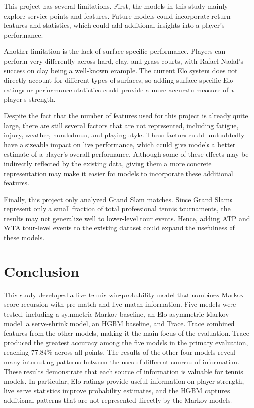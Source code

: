 \documentclass[10pt,twocolumn]{article}
\begin{document}
This project has several limitations. First, the models in this study mainly explore service points and features. Future models could incorporate return features and statistics, which could add additional insights into a player's performance.

Another limitation is the lack of surface-specific performance. Players can perform very differently across hard, clay, and grass courts, with Rafael Nadal's success on clay being a well-known example.\cite{bodo2010} The current Elo system does not directly account for different types of surfaces, so adding surface-specific Elo ratings or performance statistics could provide a more accurate measure of a player's strength.

Despite the fact that the number of features used for this project is already quite large, there are still several factors that are not represented, including fatigue, injury, weather, handedness, and playing style. These factors could undoubtedly have a sizeable impact on live performance, which could give models a better estimate of a player's overall performance. Although some of these effects may be indirectly reflected by the existing data, giving them a more concrete representation may make it easier for models to incorporate these additional features.

Finally, this project only analyzed Grand Slam matches. Since Grand Slams represent only a small fraction of total professional tennis tournaments, the results may not generalize well to lower-level tour events. Hence, adding ATP and WTA tour-level events to the existing dataset could expand the usefulness of these models.

\section{Conclusion}

This study developed a live tennis win-probability model that combines Markov score recursion with pre-match and live match information. Five models were tested, including a symmetric Markov baseline, an Elo-asymmetric Markov model, a serve-shrink model, an HGBM baseline, and Trace. Trace combined features from the other models, making it the main focus of the evaluation. Trace produced the greatest accuracy among the five models in the primary evaluation, reaching 77.84\% across all points. The results of the other four models reveal many interesting patterns between the uses of different sources of information. These results demonstrate that each source of information is valuable for tennis models. In particular, Elo ratings provide useful information on player strength, live serve statistics improve probability estimates, and the HGBM captures additional patterns that are not represented directly by the Markov models.
\end{document}
